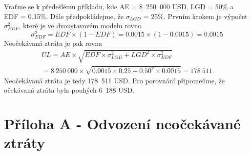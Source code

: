 \begin{example}
Vraťme se k předešlému příkladu, kde AE = 8~250~000 USD, LGD = 50\% a EDF = 0.15\%. Dále předpokládejme, že $\sigma_{LGD}$ = 25\%. Prvním krokem je výpočet $\sigma_{EDF}^2$, které je ve dvoustavovém modelu rovno
\begin{equation}
\sigma_{EDF}^2 = EDF \times (1 - EDF) = 0.0015 \times (1 - 0.0015) = 0.0015
\end{equation}
Neočekávaná ztráta je pak rovna
\begin{multline}
UL = AE \times \sqrt{EDF \times \sigma_{LGD}^2 + LGD^2 \times \sigma_{EDF}^2}\\
= 8~250~000 \times \sqrt{0.0015 \times 0.25 + 0.50^2 \times 0.0015} = 178~511
\end{multline}
Neočekávaná ztráta je tedy 178~511 USD. Pro porovnání připomeňme, že očekávaná ztráta byla pouhých 6~188 USD.
\end{example}

\section{Příloha A - Odvození neočekávané ztráty}

